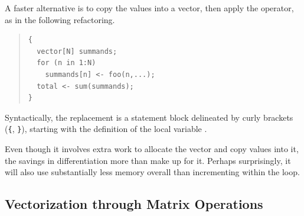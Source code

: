 A faster alternative is to copy the values into a vector, then
apply the  operator, as in the following refactoring.
%
\begin{quote}
\begin{Verbatim}
{  
  vector[N] summands;
  for (n in 1:N) 
    summands[n] <- foo(n,...);
  total <- sum(summands);
}
\end{Verbatim}
\end{quote}
%
Syntactically, the replacement is a statement block delineated
by curly brackets (\Verb|{|, \Verb|}|), starting with the definition
of the local variable .

Even though it involves extra work to allocate the 
vector and copy  values into it, the savings in
differentiation more than make up for it.  Perhaps surprisingly,
it will also use substantially less memory overall than incrementing
 within the loop.


\subsection{Vectorization through Matrix Operations}

